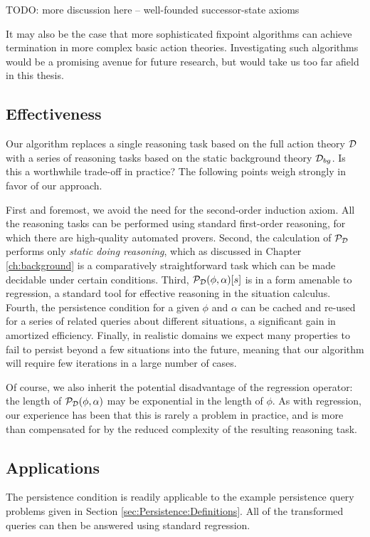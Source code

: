 TODO: more discussion here -- well-founded successor-state axioms

It may also be the case that more sophisticated fixpoint algorithms
can achieve termination in more complex basic action theories. Investigating
such algorithms would be a promising avenue for future research, but
would take us too far afield in this thesis.


\subsection{Effectiveness}

Our algorithm replaces a single reasoning task based on the full action
theory $\mathcal{D}$ with a series of reasoning tasks based on the
static background theory $\mathcal{D}_{bg}$. Is this a worthwhile trade-off
in practice? The following points weigh strongly in favor of our approach.

First and foremost, we avoid the need for the second-order induction
axiom. All the reasoning tasks can be performed using standard first-order
reasoning, for which there are high-quality automated provers. Second,
the calculation of $\mathcal{P}_{\mathcal{D}}$ performs only \emph{static doing
reasoning}, which as discussed in Chapter \ref{ch:background} is
a comparatively straightforward task which can be made decidable under
certain conditions. Third, $\mathcal{P}_{\mathcal{D}}(\phi,\alpha)[s]$
is in a form amenable to regression, a standard tool for effective
reasoning in the situation calculus. Fourth, the persistence condition
for a given $\phi$ and $\alpha$ can be cached and re-used for a
series of related queries about different situations, a significant
gain in amortized efficiency. Finally, in realistic domains we expect
many properties to fail to persist beyond a few situations into the
future, meaning that our algorithm will require few iterations in
a large number of cases.

Of course, we also inherit the potential disadvantage of the regression
operator: the length of $\mathcal{P}_{\mathcal{D}}(\phi,\alpha)$ may be exponential
in the length of $\phi$. As with regression, our experience has been
that this is rarely a problem in practice, and is more than compensated
for by the reduced complexity of the resulting reasoning task.


\subsection{Applications}

The persistence condition is readily applicable to the example persistence
query problems given in Section \ref{sec:Persistence:Definitions}.
All of the transformed queries can then be answered using standard
regression.\\


